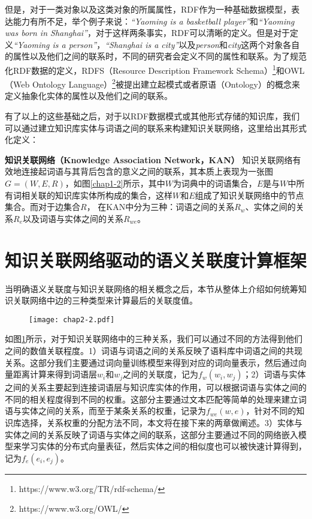 但是，对于一类对象以及这类对象的所属属性，RDF作为一种基础数据模型，表达能力有所不足，举个例子来说：\emph{“Yaoming is a basketball player”}和\emph{“Yaoming was born in Shanghai”}，对于这样两条事实，RDF可以清晰的定义。但是对于定义\emph{“Yaoming is a person”}，\emph{“Shanghai is a city”}以及\emph{person}和\emph{city}这两个对象各自的属性以及他们之间的联系时，不同的研究者会定义不同的属性和联系。为了规范化RDF数据的定义，RDFS（Resource Description Framework Schema）\footnote{https://www.w3.org/TR/rdf-schema/}和OWL（Web Ontology Language）\footnote{https://www.w3.org/OWL/}被提出建立起模式或者原语（Ontology）的概念来定义抽象化实体的属性以及他们之间的联系。

有了以上的这些基础之后，对于以RDF数据模式或其他形式存储的知识库，我们可以通过建立知识库实体与词语之间的联系来构建知识关联网络，这里给出其形式化定义：
\begin{definition}
    \label{kan}
    {\bf 知识关联网络（Knowledge Association Network，KAN）}
    知识关联网络有效地连接起词语与其背后包含的意义之间的联系，其本质上表现为一张图$G=(W, E, R)$，如图\ref{chap1-2}所示，其中$W$为词典中的词语集合，$E$是与$W$中所有词相关联的知识库实体所构成的集合，这样$W$和$E$组成了知识关联网络中的节点集合。而对于边集合$R$， 在KAN中分为三种：词语之间的关系$R_w$、实体之间的关系$R_e$以及词语与实体之间的关系$R_{we}$。
\end{definition}


\section{知识关联网络驱动的语义关联度计算框架}
\label{chap02-sr}
当明确语义关联度与知识关联网络的相关概念之后，本节从整体上介绍如何统筹知识关联网络中边的三种类型来计算最后的关联度值。

\begin{figure}[!ht]
    \centerline{\texttt{[image: chap2-2.pdf]}}
    \label{chap2-2}
\end{figure}

如图\ref{chap2-2}所示，对于知识关联网络中的三种关系，我们可以通过不同的方法得到他们之间的数值关联程度。1）词语与词语之间的关系反映了语料库中词语之间的共现关系。这部分我们主要通过词向量训练模型来得到对应的词向量表示，然后通过向量距离计算来得到词语层$w_i$和$w_j$之间的关联度，记为$f_w(w_i, w_j)$；2）词语与实体之间的关系主要起到连接词语层与知识库实体的作用，可以根据词语与实体之间的不同的相关程度得到不同的权重。这部分主要通过文本匹配等简单的处理来建立词语与实体之间的关系，而至于某条关系的权重，记录为$f_{we}(w, e)$，针对不同的知识库选择，关系权重的分配方法不同，本文将在接下来的两章做阐述。3）实体与实体之间的关系反映了词语与实体之间的联系，这部分主要通过不同的网络嵌入模型来学习实体的分布式向量表征，然后实体之间的相似度也可以被快速计算得到，记为$f_{e}(e_i, e_j)$。

